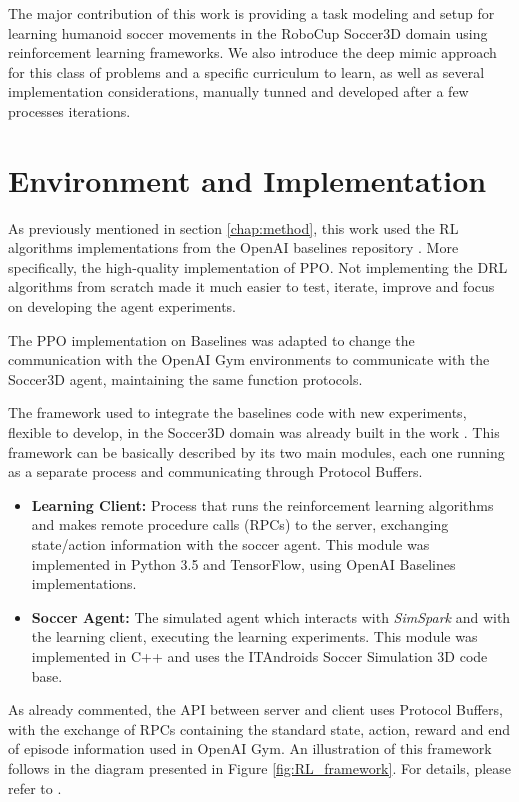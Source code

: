 
The major contribution of this work is providing a task modeling and setup for learning humanoid soccer movements in the RoboCup Soccer3D domain using reinforcement learning frameworks. We also introduce the deep mimic approach for this class of problems and a specific curriculum to learn, as well as several implementation considerations, manually tunned and developed after a few processes iterations.

\section{Environment and Implementation}

As previously mentioned in section \ref{chap:method}, this work used the RL algorithms implementations from the OpenAI baselines repository \cite{baselines}. More specifically, the high-quality implementation of PPO. Not implementing the DRL algorithms from scratch made it much easier to test, iterate, improve and focus on developing the agent experiments.

The PPO implementation on Baselines was adapted to change the communication with the OpenAI Gym environments to communicate with the Soccer3D agent, maintaining the same function protocols.

The framework used to integrate the baselines code with new experiments, flexible to develop, in the Soccer3D domain was already built in the work \cite{TGMuzio}. This framework can be basically described by its two main modules, each one running as a separate process and communicating through Protocol Buffers.

\begin{itemize}
\item \textbf{Learning Client:} Process that runs the reinforcement learning algorithms and makes remote procedure calls (RPCs) to the server, exchanging state/action information with the soccer agent. This module was implemented in Python 3.5 and TensorFlow, using OpenAI Baselines implementations.

\item \textbf{Soccer Agent:} The simulated agent which interacts with \textit{SimSpark} and with the learning client, executing the learning experiments. This module was implemented in C++ and uses the ITAndroids Soccer Simulation 3D code base.
\end{itemize}

As already commented, the API between server and client uses Protocol Buffers, with the exchange of RPCs containing the standard state, action, reward and end of episode information used in OpenAI Gym. An illustration of this framework follows in the diagram presented in Figure \ref{fig:RL_framework}. For details, please refer to \cite{TGMuzio}.

